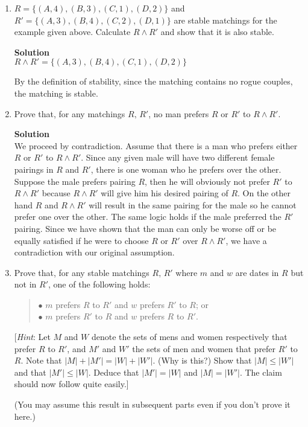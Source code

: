 \documentclass[11pt]{article}
\newenvironment{Parts}{\begin{enumerate}[label=(\alph*)]}{\end{enumerate}}
\newcommand*{\Part}{\item}
\newenvironment{Answer}{\vspace{10pt}\begin{mdframed}\textbf{Solution}\\}{\end{mdframed}\vfill\pagebreak[3]}
\newenvironment{Answer}{\vspace{10pt}}{\vfill\pagebreak[3]}
\begin{document}
\begin{Parts}
\Part $R=\{(A,4),(B,3),(C,1),(D,2)\}$ and
$R'=\{(A,3),(B,4),(C,2),(D,1)\}$ are stable matchings for the
example given above. Calculate $R \land R'$
and show that it is also stable.

\begin{Answer}
$R \land R'=\{(A,3), (B,4), (C,1), (D, 2)\}$

By the definition of stability, since the matching contains no rogue couples, the matching is stable.

\end{Answer}

\Part Prove that, for any matchings $R,\,R'$,
no man prefers $R$ or $R'$ to $R \land R'$.

\begin{Answer}
    We proceed by contradiction. Assume that there is a man who prefers either $R$ or $R'$ to $R \land R'$. Since any given male will have two different female pairings in $R$ and $R'$, there is one woman who he prefers over the other. Suppose the male prefers pairing $R$, then he will obviously not prefer $R'$ to $R \land R'$ because $R \land R'$ will give him his desired pairing of $R$. On the other hand $R$ and $R \land R'$ will result in the same pairing for the male so he cannot prefer one over the other. The same logic holds if the male preferred the $R'$ pairing. Since we have shown that the man can only be worse off or be equally satisfied if he were to choose $R$ or $R'$ over $R \land R'$, we have a contradiction with our original assumption. 
\end{Answer}

\Part  Prove that, for any stable matchings $R,\,R'$
where $m$ and $w$ are dates in $R$ but not in $R'$, one of the following
holds:
\begin{quote}
$\bullet$ $m$ prefers $R$ to $R'$ and $w$ prefers $R'$ to $R$; or\\
$\bullet$ $m$ prefers $R'$ to $R$ and $w$ prefers $R$ to $R'$.
\end{quote}
[\textit{Hint}: Let $M$ and $W$ denote the sets of mens and women respectively
that prefer $R$ to $R'$, and $M'$ and $W'$ the sets of men and women that prefer $R'$ to $R$.  Note that $|M|+|M'|=|W|+|W'|$. (Why is this?) Show that $|M| \leq |W'|$ and that $|M'| \leq |W|$.  Deduce that $|M'|=|W|$ and $|M|=|W'|$.  The claim should now follow quite easily.]

(You may assume this result in subsequent parts even if you don't prove it here.)


\end{Parts}
\end{document}
